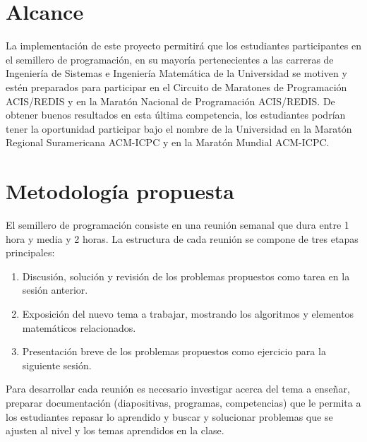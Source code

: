 \documentclass[11pt, oneside]{article}
\theoremstyle{definition}
\theoremstyle{remark}
\begin{document}
\section{Alcance}
La implementación de este proyecto permitirá que los estudiantes participantes en el semillero de programación, en su mayoría pertenecientes a las carreras de Ingeniería de Sistemas e Ingeniería Matemática de la Universidad se motiven y estén preparados para participar en el Circuito de Maratones de Programación ACIS/REDIS y en la Maratón Nacional de Programación ACIS/REDIS. De obtener buenos resultados en esta última competencia, los estudiantes podrían tener la oportunidad participar bajo el nombre de la Universidad en la Maratón Regional Suramericana ACM-ICPC y en la Maratón Mundial ACM-ICPC.

\section{Metodología propuesta}
El semillero de programación consiste en una reunión semanal que dura entre 1 hora y media y 2 horas. La estructura de cada reunión se compone de tres etapas principales:
\begin{enumerate}
	\item{Discusión, solución y revisión de los problemas propuestos como tarea en la sesión anterior.}
	\item{Exposición del nuevo tema a trabajar, mostrando los algoritmos y elementos matemáticos relacionados.}
	\item{Presentación breve de los problemas propuestos como ejercicio para la siguiente sesión.}
\end{enumerate}
Para desarrollar cada reunión es necesario investigar acerca del tema a enseñar, preparar documentación (diapositivas, programas, competencias) que le permita a los estudiantes repasar lo aprendido y buscar y solucionar problemas que se ajusten al nivel y los temas aprendidos en la clase.
\end{document}
